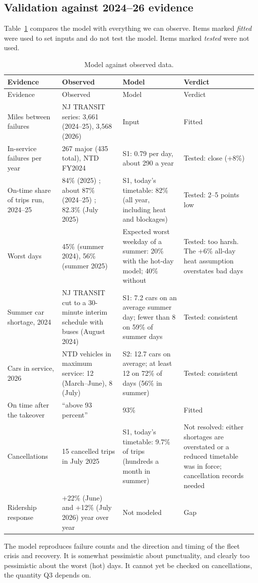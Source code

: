 \documentclass[11pt]{article}
\begin{document}
\subsection{Validation against 2024--26 evidence}
Table~\ref{tab:valid} compares the model with everything we can observe. Items marked \emph{fitted} were used to set inputs and do not test the model. Items marked \emph{tested} were not used.
{\small
\begin{longtable}{@{}p{3.5cm}p{4.2cm}p{4.2cm}p{3.1cm}@{}}
\caption{Model against observed data.}\label{tab:valid}\\
\toprule
Evidence & Observed & Model & Verdict \\ \midrule\endfirsthead
\toprule Evidence & Observed & Model & Verdict \\ \midrule\endhead
Miles between failures & NJ TRANSIT series: 3{,}661 (2024--25), 3{,}568 (2026) \citep{njt_mdbf} & Input & Fitted \\
In-service failures per year & 267 major (435 total), NTD FY2024 \citep{ntd_breakdowns2224} & S1: 0.79 per day, about 290 a year & Tested: close (+8\%) \\
On-time share of trips run, 2024--25 & 84\% (2025) \citep{njtod2026}; about 87\% (2024--25) \citep{ols2027njt}; 82.3\% (July 2025) \citep{news12_2025} & S1, today's timetable: 82\% (all year, including heat and blockages) & Tested: 2--5 points low \\
Worst days & 45\% (summer 2024), 56\% (summer 2025) \citep{ols2027njt} & Expected worst weekday of a summer: 20\% with the hot-day model; 40\% without & Tested: too harsh. The +6\% all-day heat assumption overstates bad days \\
Summer car shortage, 2024 & NJ TRANSIT cut to a 30-minute interim schedule with buses (August 2024) \citep{njt2024interim} & S1: 7.2 cars on an average summer day; fewer than 8 on 59\% of summer days & Tested: consistent \\
Cars in service, 2026 & NTD vehicles in maximum service: 12 (March--June), 8 (July) \citep{ntd_monthly} & S2: 12.7 cars on average; at least 12 on 72\% of days (56\% in summer) & Tested: consistent \\
On time after the takeover & ``above 93 percent'' \citep{ols2027njt} & 93\% & Fitted \\
Cancellations & 15 cancelled trips in July 2025 \citep{singleton2025} & S1, today's timetable: 9.7\% of trips (hundreds a month in summer) & Not resolved: either shortages are overstated or a reduced timetable was in force; cancellation records needed \\
Ridership response & +22\% (June) and +12\% (July 2026) year over year \citep{ntd_monthly} & Not modeled & Gap \\
\bottomrule
\end{longtable}}
The model reproduces failure counts and the direction and timing of the fleet crisis and recovery. It is somewhat pessimistic about punctuality, and clearly too pessimistic about the worst (hot) days. It cannot yet be checked on cancellations, the quantity Q3 depends on.
\end{document}
